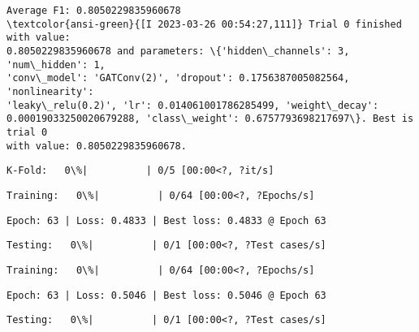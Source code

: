 \documentclass[11pt]{article}
\begin{document}
    
    \begin{Verbatim}[commandchars=\\\{\}]
Average F1: 0.8050229835960678
\textcolor{ansi-green}{[I 2023-03-26 00:54:27,111]} Trial 0 finished with value:
0.8050229835960678 and parameters: \{'hidden\_channels': 3, 'num\_hidden': 1,
'conv\_model': 'GATConv(2)', 'dropout': 0.1756387005082564, 'nonlinearity':
'leaky\_relu(0.2)', 'lr': 0.014061001786285499, 'weight\_decay':
0.00019033250020679288, 'class\_weight': 0.6757793698217697\}. Best is trial 0
with value: 0.8050229835960678.
    \end{Verbatim}

    
    \begin{Verbatim}[commandchars=\\\{\}]
K-Fold:   0\%|          | 0/5 [00:00<?, ?it/s]
    \end{Verbatim}

    
    
    \begin{Verbatim}[commandchars=\\\{\}]
Training:   0\%|          | 0/64 [00:00<?, ?Epochs/s]
    \end{Verbatim}

    
    \begin{Verbatim}[commandchars=\\\{\}]
Epoch: 63 | Loss: 0.4833 | Best loss: 0.4833 @ Epoch 63
    \end{Verbatim}

    
    \begin{Verbatim}[commandchars=\\\{\}]
Testing:   0\%|          | 0/1 [00:00<?, ?Test cases/s]
    \end{Verbatim}

    
    
    \begin{Verbatim}[commandchars=\\\{\}]
Training:   0\%|          | 0/64 [00:00<?, ?Epochs/s]
    \end{Verbatim}

    
    \begin{Verbatim}[commandchars=\\\{\}]
Epoch: 63 | Loss: 0.5046 | Best loss: 0.5046 @ Epoch 63
    \end{Verbatim}

    
    \begin{Verbatim}[commandchars=\\\{\}]
Testing:   0\%|          | 0/1 [00:00<?, ?Test cases/s]
    \end{Verbatim}
\end{document}
